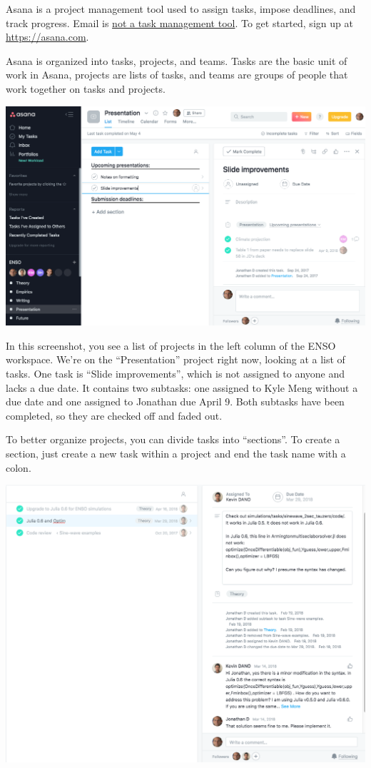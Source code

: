 Asana is a project management tool used to assign tasks, impose deadlines, and track progress.
Email is \href{https://facilethings.com/blog/en/your-email-is-not-a-todo-list}{not a task management tool}.
To get started, sign up at \url{https://asana.com}.

Asana is organized into tasks, projects, and teams.
Tasks are the basic unit of work in Asana,
projects are lists of tasks, and
teams are groups of people that work together on tasks and projects.

\begin{center}
\includegraphics[width=\textwidth]{./figures/workflow/asana_screenshot1.png}
\end{center}

In this screenshot,
you see a list of projects in the left column of the ENSO workspace.
We're on the ``Presentation'' project right now, looking at a list of tasks.
One task is ``Slide improvements'', which is not assigned to anyone and lacks a due date.
It contains two subtasks:
one assigned to Kyle Meng without a due date
and
one assigned to Jonathan due April 9.
Both subtasks have been completed, so they are checked off and faded out.

To better organize projects, you can divide tasks into ``sections''.
To create a section, just create a new task within a project and end the task name with a colon.


\begin{center}
\includegraphics[width=.8\textwidth]{./figures/workflow/asana_screenshot2.png}
\end{center}


